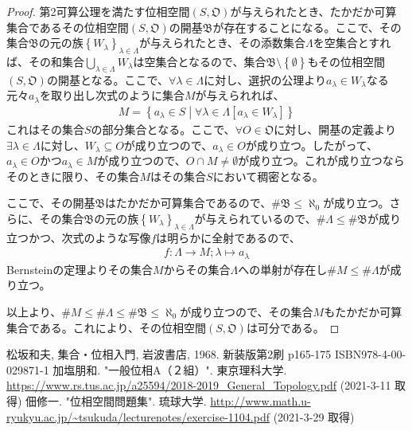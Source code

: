 \documentclass[dvipdfmx]{jsarticle}
\begin{document}
\begin{proof}
第2可算公理を満たす位相空間$\left( S,\mathfrak{O} \right)$が与えられたとき、たかだか可算集合であるその位相空間$\left( S,\mathfrak{O} \right)$の開基$\mathfrak{B}$が存在することになる。ここで、その集合$\mathfrak{B}$の元の族$\left\{ W_{\lambda} \right\}_{\lambda \in \varLambda}$が与えられたとき、その添数集合$\varLambda$を空集合とすれば、その和集合$\bigcup_{\lambda \in \varLambda} W_{\lambda}$は空集合となるので、集合$\mathfrak{B \setminus}\left\{ \emptyset \right\}$もその位相空間$\left( S,\mathfrak{O} \right)$の開基となる。ここで、$\forall\lambda \in \varLambda$に対し、選択の公理より$a_{\lambda} \in W_{\lambda}$なる元々$a_{\lambda}$を取り出し次式のように集合$M$が与えられれば、
\begin{align*}
M = \left\{ a_{\lambda} \in S \middle| \forall\lambda \in \varLambda\left[ a_{\lambda} \in W_{\lambda} \right] \right\}
\end{align*}
これはその集合$S$の部分集合となる。ここで、$\forall O \in \mathfrak{O}$に対し、開基の定義より$\exists\lambda \in \varLambda$に対し、$W_{\lambda} \subseteq O$が成り立つので、$a_{\lambda} \in O$が成り立つ。したがって、$a_{\lambda} \in O$かつ$a_{\lambda} \in M$が成り立つので、$O \cap M \neq \emptyset$が成り立つ。これが成り立つならそのときに限り、その集合$M$はその集合$S$において稠密となる。\par
ここで、その開基$\mathfrak{B}$はたかだか可算集合であるので、${\#}\mathfrak{B} \leq \aleph_{0}$が成り立つ。さらに、その集合$\mathfrak{B}$の元の族$\left\{ W_{\lambda} \right\}_{\lambda \in \varLambda}$が与えられているので、${\#}\varLambda \leq {\#}\mathfrak{B}$が成り立つかつ、次式のような写像$f$は明らかに全射であるので、
\begin{align*}
f:\varLambda \rightarrow M;\lambda \mapsto a_{\lambda}
\end{align*}
Bernsteinの定理よりその集合$M$からその集合$\varLambda$への単射が存在し${\#}M \leq {\#}\varLambda$が成り立つ。\par
以上より、${\#}M \leq {\#}\varLambda \leq {\#}\mathfrak{B} \leq \aleph_{0}$が成り立つので、その集合$M$もたかだか可算集合である。これにより、その位相空間$\left( S,\mathfrak{O} \right)$は可分である。
\end{proof}
\begin{thebibliography}{50}
  松坂和夫, 集合・位相入門, 岩波書店, 1968. 新装版第2刷 p165-175 ISBN978-4-00-029871-1
  加塩朋和. "一般位相A（２組）". 東京理科大学. \url{https://www.rs.tus.ac.jp/a25594/2018-2019_General_Topology.pdf} (2021-3-11 取得)
  佃修一. "位相空間問題集". 琉球大学. \url{http://www.math.u-ryukyu.ac.jp/~tsukuda/lecturenotes/exercise-1104.pdf} (2021-3-29 取得)
\end{thebibliography}
\end{document}

